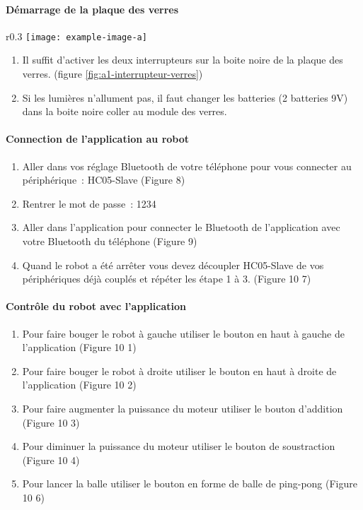\paragraph{Démarrage de la plaque des verres}

\begin{wrapfigure}{r}{0.3\linewidth}
    \centering
    \texttt{[image: example-image-a]}
    \caption{Interrupteur de mise en marche de la plaque de verres}
    \label{fig:a1-interrupteur-verres}
\end{wrapfigure}

\begin{enumerate}
    \item Il suffit d’activer les deux interrupteurs sur la boite noire de la plaque des verres. (figure \ref{fig:a1-interrupteur-verres})
    \item Si les lumières n’allument pas, il faut changer les batteries (2 batteries 9V) dans la boite noire coller au module des verres.
\end{enumerate}

\paragraph{Connection de l'application au robot}


\begin{enumerate}
    \item Aller dans vos réglage Bluetooth de votre téléphone pour vous connecter au périphérique : HC05-Slave (Figure 8)
    \item Rentrer le mot de passe : 1234
    \item Aller dans l’application pour connecter le Bluetooth de l’application avec votre Bluetooth du téléphone (Figure 9)
    \item Quand le robot a été arrêter vous devez découpler HC05-Slave de vos périphériques déjà couplés et répéter les étape 1 à 3. (Figure 10 7)
\end{enumerate}

\paragraph{Contrôle du robot avec l’application}


\begin{enumerate}
    \item Pour faire bouger le robot à gauche utiliser le bouton en haut à gauche de l’application (Figure 10 1)
    \item Pour faire bouger le robot à droite utiliser le bouton en haut à droite de l’application (Figure 10 2)
    \item Pour faire augmenter la puissance du moteur utiliser le bouton d’addition (Figure 10 3)
    \item Pour diminuer la puissance du moteur utiliser le bouton de soustraction (Figure 10 4)
    \item Pour lancer la balle utiliser le bouton en forme de balle de ping-pong (Figure 10 6)
\end{enumerate}
